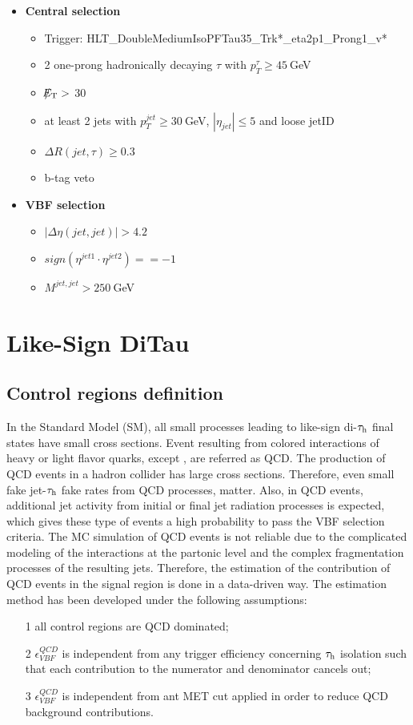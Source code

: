 \begin{itemize}
	\item \textbf{Central selection}
	\begin{itemize}
		\item Trigger: HLT\_DoubleMediumIsoPFTau35\_Trk*\_eta2p1\_Prong1\_v*
		\item 2 one-prong hadronically decaying $\tau$ with $p_{T}^{\tau}\geq45~$GeV 
		\item $\slash\mkern-12mu{E}_{\text{T}} > $ 30
		\item at least 2 jets with $p_{T}^{jet}\geq30~$GeV, $|\eta_{jet}|\leq5$ and loose jetID
		\item $\Delta R(jet,\tau)\geq0.3$
		\item b-tag veto
	\end{itemize}
	\item \textbf{VBF selection}
	\begin{itemize}
		\item $|\Delta\eta(jet,jet)| > 4.2$
		\item $sign(\eta^{jet 1}\cdot\eta^{jet 2})==-1$
		\item $M^{jet,jet}>250~$GeV
	\end{itemize}
\end{itemize}

\section{Like-Sign DiTau} \label{secLSditau}

\subsection{Control regions definition} \label{sec:crsdef}


In the Standard Model (SM), all small processes leading to like-sign di-$\tau_{\text{h}}$ final states have small cross sections. Event resulting from colored interactions of heavy or light flavor quarks, except \ttbar, are referred as QCD. The production of QCD events in a hadron collider has large cross sections. Therefore, even small fake jet-$\tau_{\text{h}}$ fake rates from QCD processes, matter. Also, in QCD events, additional jet activity from initial or final jet radiation processes is expected, which gives these type of events a high probability to pass the VBF selection criteria.
The MC simulation of QCD events is not reliable due to the complicated modeling of the interactions at the partonic level and the complex fragmentation processes of the resulting jets. Therefore, the estimation of the contribution of QCD events in the signal region is done in a data-driven way. The estimation method has been developed under the following assumptions:
\begin{itemize}
\item[1] all control regions are QCD dominated;
\item[2] $\epsilon^{QCD}_{VBF}$ is independent from any trigger efficiency concerning $\tau_{\text{h}}$ isolation such that each contribution to the numerator and denominator cancels out;
\item[3] $\epsilon^{QCD}_{VBF}$ is independent from ant MET cut applied in order to reduce QCD background contributions. 
\end{itemize}

